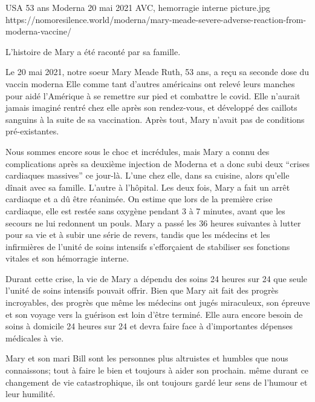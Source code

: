 {USA}
{53 ans}
{Moderna}
{20 mai 2021 }
{AVC, hemorragie interne}
{picture.jpg}
{https://nomoresilence.world/moderna/mary-meade-severe-adverse-reaction-from-moderna-vaccine/}
{

L'histoire de Mary a été raconté par sa famille.

Le 20 mai 2021, notre soeur Mary Meade Ruth, 53 ans, a reçu sa seconde dose du vaccin moderna Elle comme tant d'autres américains ont relevé leurs manches pour aidé l'Amérique à se remettre sur pied et combattre le covid. Elle n'aurait jamais imaginé rentré chez elle après son rendez-vous, et développé des caillots sanguins à la suite de sa vaccination. Après tout, Mary n'avait pas de conditions pré-existantes.

Nous sommes encore sous le choc et incrédules, mais Mary a connu des complications après sa deuxième injection de Moderna et a donc subi deux “crises cardiaques massives” ce jour-là. L'une chez elle, dans sa cuisine, alors qu'elle dînait avec sa famille. L'autre à l'hôpital. Les deux fois, Mary a fait un arrêt cardiaque et a dû être réanimée. On estime que lors de la première crise cardiaque, elle est restée sans oxygène pendant 3 à 7 minutes, avant que les secours ne lui redonnent un pouls. Mary a passé les 36 heures suivantes à lutter pour sa vie et à subir une série de revers, tandis que les médecins et les infirmières de l'unité de soins intensifs s'efforçaient de stabiliser ses fonctions vitales et son hémorragie interne.

Durant cette crise, la vie de Mary a dépendu des soins 24 heures sur 24 que seule l'unité de soins intensifs pouvait offrir. Bien que Mary ait fait des progrès incroyables, des progrès que même les médecins ont jugés miraculeux, son épreuve et son voyage vers la guérison est loin d'être terminé. Elle aura encore besoin de soins à domicile 24 heures sur 24 et devra faire face à d'importantes dépenses médicales à vie.

Mary et son mari Bill sont les personnes plus altruistes et humbles que nous connaissons; tout à faire le bien et toujours à aider son prochain. même durant ce changement de vie catastrophique, ils ont toujours gardé leur sens de l'humour et leur humilité.

}
